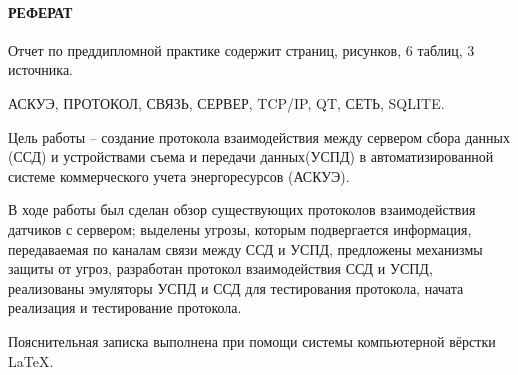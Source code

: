 \newpage
{}
\paragraph*{\hfill РЕФЕРАТ \hfill}
Отчет по преддипломной практике содержит  страниц,  рисунков,  6 таблиц, 3 источника.

АСКУЭ, ПРОТОКОЛ, СВЯЗЬ, СЕРВЕР, TCP/IP, QT, СЕТЬ, SQLITE.

Цель работы -- создание протокола взаимодействия между сервером сбора данных (ССД) и устройствами съема и передачи данных(УСПД) в автоматизированной системе коммерческого учета энергоресурсов (АСКУЭ).

В ходе работы был сделан обзор существующих протоколов взаимодействия датчиков с сервером; выделены угрозы, которым подвергается информация, передаваемая по каналам связи между ССД и УСПД, предложены механизмы защиты от угроз, разработан протокол взаимодействия ССД и УСПД, реализованы эмуляторы УСПД и ССД для тестирования протокола, начата реализация и тестирование протокола.  %

Пояснительная записка выполнена при помощи системы компьютерной вёрстки \LaTeX.
